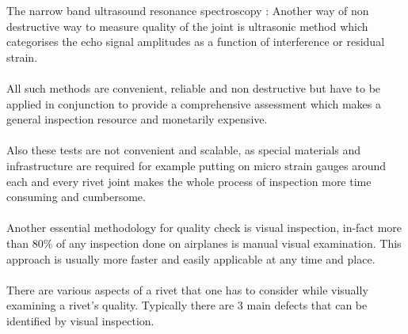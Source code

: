 \documentclass{article}
\begin{document}
    
    The narrow band ultrasound resonance spectroscopy :
    Another way of non destructive way to measure quality of the joint is ultrasonic  method which categorises the echo signal amplitudes as a function of interference or residual strain.\cite{osti_191779} \\\\
    All such methods are convenient, reliable  and non destructive but have to be applied in conjunction to provide a comprehensive assessment which makes a general inspection resource and monetarily expensive. \\\\
    Also these tests are not convenient and scalable, as special materials and infrastructure are required for example putting on micro strain gauges around each and every rivet joint makes the whole process of inspection more time consuming and cumbersome.\\\\
    Another essential methodology for quality check is visual inspection, in-fact more than 80\% of any inspection done on airplanes is manual visual examination. This approach is usually more faster and easily applicable at any time and place.\\\\
    There are various aspects of a rivet that one has to consider while visually examining a rivet's quality. Typically there are 3 main defects that can be identified by visual inspection. \cite{FAA_visual_Inspection} 
\end{document}
